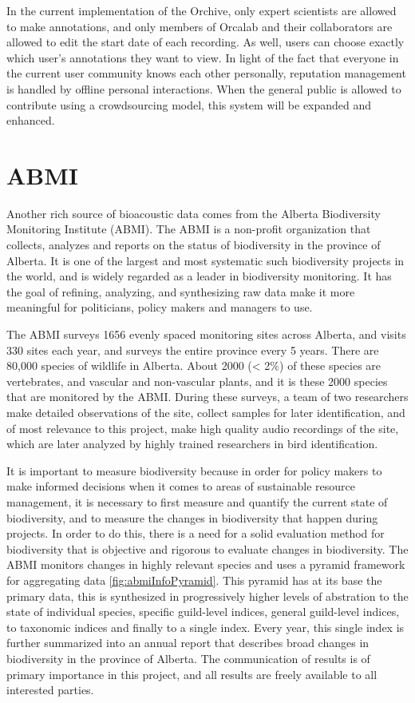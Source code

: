 \documentclass[12pt,oneside]{book}
\begin{document}
In the current implementation of the Orchive, only expert scientists
are allowed to make annotations, and only members of Orcalab and their
collaborators are allowed to edit the start date of each recording.
As well, users can choose exactly which user's annotations they want
to view.  In light of the fact that everyone in the current user
community knows each other personally, reputation management is
handled by offline personal interactions.  When the general public is
allowed to contribute using a crowdsourcing model, this system will be
expanded and enhanced.


\section{ABMI}\label{sec:abmi}

Another rich source of bioacoustic data comes from the Alberta
Biodiversity Monitoring Institute (ABMI).  The ABMI is a non-profit
organization that collects, analyzes and reports on the status of
biodiversity in the province of Alberta.  It is one of the largest and
most systematic such biodiversity projects in the world, and is widely
regarded as a leader in biodiversity monitoring.  It has the goal of
refining, analyzing, and synthesizing raw data make it more meaningful
for politicians, policy makers and managers to use.

The ABMI surveys 1656 evenly spaced monitoring sites across Alberta,
and visits 330 sites each year, and surveys the entire province every
5 years.  There are 80,000 species of wildlife in Alberta. About 2000
(< 2\%) of these species are vertebrates, and vascular and
non-vascular plants, and it is these 2000 species that are monitored
by the ABMI.  During these surveys, a team of two researchers make
detailed observations of the site, collect samples for later
identification, and of most relevance to this project, make high
quality audio recordings of the site, which are later analyzed by
highly trained researchers in bird identification.

It is important to measure biodiversity because in order for policy
makers to make informed decisions when it comes to areas of
sustainable resource management, it is necessary to first measure and
quantify the current state of biodiversity, and to measure the changes
in biodiversity that happen during projects.  In order to do this,
there is a need for a solid evaluation method for biodiversity that is
objective and rigorous to evaluate changes in biodiversity. The ABMI
monitors changes in highly relevant species and uses a pyramid
framework for aggregating data \ref{fig:abmiInfoPyramid}.  This
pyramid has at its base the primary data, this is synthesized in
progressively higher levels of abstration to the state of individual
species, specific guild-level indices, general guild-level indices, to
taxonomic indices and finally to a single index.  Every year, this
single index is further summarized into an annual report that
describes broad changes in biodiversity in the province of Alberta.
The communication of results is of primary importance in this project,
and all results are freely available to all interested parties.
\end{document}
